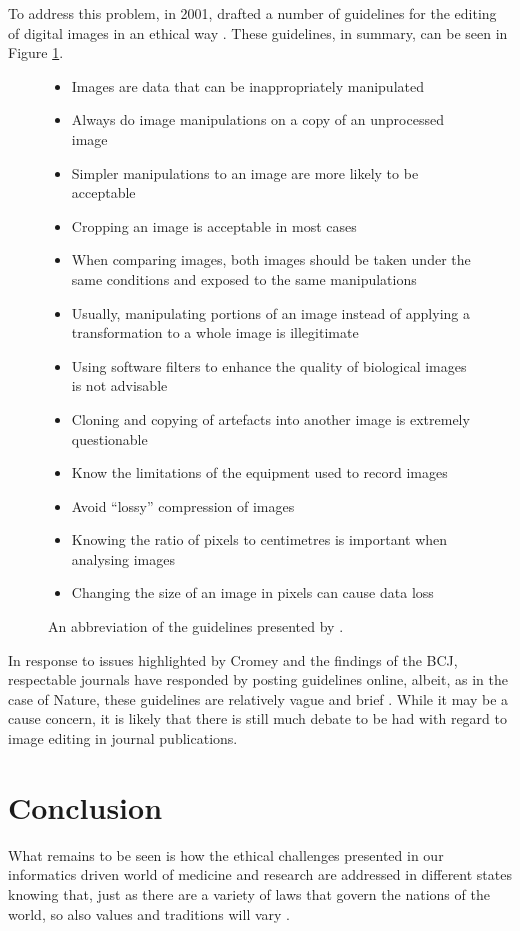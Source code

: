 \documentclass[british,a4paper, 12pt]{article}
\begin{document}
To address this problem, in 2001, \citeauthor*{cromey2001digital} drafted a number of guidelines for
the editing of digital images in an ethical way \parencite{cromey2001digital}. These guidelines,
in summary, can be seen in Figure \ref{fig:ethicalguidelines}.

\begin{figure}
\label{fig:ethicalguidelines}
\begin{itemize}
\item Images are data that can be inappropriately manipulated
\item Always do image manipulations on a copy of an unprocessed image
\item Simpler manipulations to an image are more likely to be acceptable
\item Cropping an image is acceptable in most cases
\item When comparing images, both images should be taken under the same conditions and exposed to the same manipulations
\item Usually, manipulating portions of an image instead of applying a transformation to a whole image is illegitimate
\item Using software filters to enhance the quality of biological images is not advisable
\item Cloning and copying of artefacts into another image is extremely questionable
\item Know the limitations of the equipment used to record images
\item Avoid ``lossy'' compression of images
\item Knowing the ratio of pixels to centimetres is important when analysing images
\item Changing the size of an image in pixels can cause data loss
\end{itemize}

\caption{An abbreviation of the guidelines presented by \parencite{cromey2001digital}.}
\end{figure}


In response to issues highlighted by Cromey and the findings of the BCJ, respectable
journals have responded by posting guidelines online, albeit, as in the case of Nature,
these guidelines are relatively vague and brief \parencite{natureimg}. While it may be a
cause concern, it is likely that there is still much debate to be had with regard to image
editing in journal publications.

\section{Conclusion}

What remains to be seen is how the ethical challenges presented in our informatics driven
world of medicine and research are addressed in different states knowing that, just as there
are a variety of laws that govern the nations of the world, so also values and traditions will
vary \cite{kluge2000professional}.


\printbibliography
\end{document}
